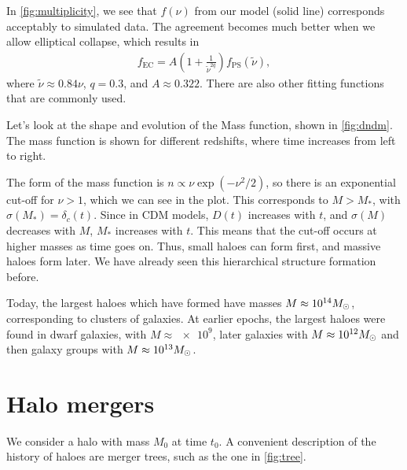 In \cref{fig:multiplicity}, we see that $f(\nu)$ from our model (solid line) corresponds acceptably to simulated data.
The agreement becomes much better when we allow elliptical collapse, which results in
\begin{align*}
	f_\text{EC}
	= A\left( 1 + \frac{1}{\tilde{\nu}^{2q}} \right) f_\text{PS}(\tilde{\nu}),
\end{align*}
where $\tilde{\nu} \approx 0.84 \nu$, $q = 0.3$, and $A \approx 0.322$.
There are also other fitting functions that are commonly used.


Let's look at the shape and evolution of the Mass function, shown in \cref{fig:dndm}.
The mass function is shown for different redshifts, where time increases from left to right.

The form of the mass function is $n \propto \nu \exp(-\nu^2/2)$, 
so there is an exponential cut-off for $\nu > 1$,
which we can see in the plot.
This corresponds to $M > M_*$, with $\sigma(M_*) = \delta_c(t)$.
Since in CDM models, $D(t)$ increases with $t$, and $\sigma(M)$ decreases with $M$,
$M_*$ increases with $t$.
This means that the cut-off occurs at higher masses as time goes on.
Thus, small haloes can form first, and massive haloes form later.
We have already seen this hierarchical structure formation before.


Today, the largest haloes which have formed have masses $M \approx \num{e14} M_\odot$, corresponding to clusters of galaxies.
At earlier epochs, the largest haloes were found in dwarf galaxies, with $M \approx \num{e9}$,
later galaxies with $M \approx \num{e12} M_\odot$
and then galaxy groups with  $M \approx \num{e13} M_\odot$.




\section{Halo mergers}

We consider a halo with mass $M_0$ at time $t_0$.
A convenient description of the history of haloes are merger trees, such as the one in \cref{fig:tree}.

